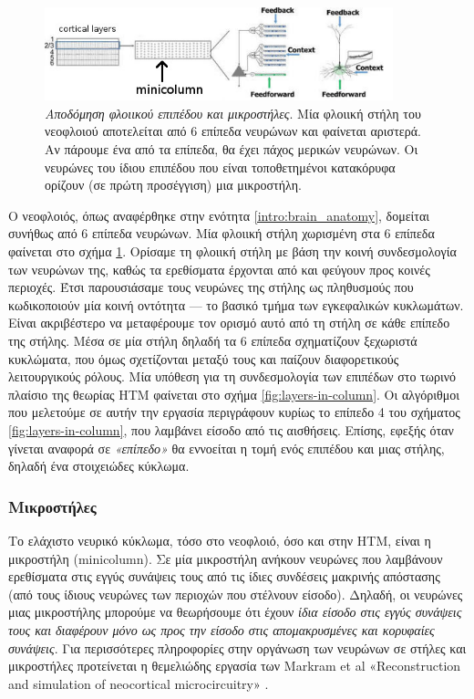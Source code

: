 	\begin{figure}
		\centering
		\includegraphics[width=0.9\textwidth]{figures/layer-minicolumn}
		\caption{\textit{Αποδόμηση φλοιικού επιπέδου και μικροστήλες}.
		Μία φλοιική στήλη του νεοφλοιού αποτελείται από 6 επίπεδα νευρώνων και φαίνεται αριστερά.
		Αν πάρουμε ένα από τα επίπεδα, θα έχει πάχος μερικών νευρώνων.
		Οι νευρώνες του ίδιου επιπέδου που είναι τοποθετημένοι κατακόρυφα ορίζουν (σε πρώτη προσέγγιση) μια μικροστήλη.
		\parencite[πηγή][(τροποποιημένο)]{cuiContinuousOnlineSequence2016}
		}
		\label{fig:layer-minicolumn}
	\end{figure}

	Ο νεοφλοιός, όπως αναφέρθηκε στην ενότητα \ref{intro:brain_anatomy}, δομείται συνήθως από 6 επίπεδα νευρώνων.
	Μία φλοιική στήλη χωρισμένη στα 6 επίπεδα φαίνεται στο σχήμα \ref{fig:layer-minicolumn}.
	Ορίσαμε τη φλοιική στήλη με βάση την κοινή συνδεσμολογία των νευρώνων της, καθώς τα ερεθίσματα έρχονται από και φεύγουν προς κοινές περιοχές.
	Έτσι παρουσιάσαμε τους νευρώνες της στήλης ως πληθυσμούς που κωδικοποιούν μία κοινή οντότητα --- το βασικό τμήμα των εγκεφαλικών κυκλωμάτων.
	Είναι ακριβέστερο να μεταφέρουμε τον ορισμό αυτό από τη στήλη σε κάθε επίπεδο της στήλης.
	Μέσα σε μία στήλη δηλαδή τα 6 επίπεδα σχηματίζουν ξεχωριστά κυκλώματα, που όμως σχετίζονται μεταξύ τους και παίζουν διαφορετικούς λειτουργικούς ρόλους.
	Μία υπόθεση για τη συνδεσμολογία των επιπέδων στο τωρινό πλαίσιο της θεωρίας HTM φαίνεται στο σχήμα \ref{fig:layers-in-column}.
  Οι αλγόριθμοι που μελετούμε σε αυτήν την εργασία περιγράφουν κυρίως το επίπεδο 4 του σχήματος \ref{fig:layers-in-column}, που λαμβάνει είσοδο από τις αισθήσεις.
	Επίσης, εφεξής όταν γίνεται αναφορά σε \textit{«επίπεδο»} θα εννοείται η τομή ενός επιπέδου και μιας στήλης, δηλαδή ένα στοιχειώδες κύκλωμα.

	\subsubsection{Μικροστήλες}

	Το ελάχιστο νευρικό κύκλωμα, τόσο στο νεοφλοιό, όσο και στην HTM, είναι η μικροστήλη (minicolumn).
	Σε μία μικροστήλη ανήκουν νευρώνες που λαμβάνουν ερεθίσματα στις εγγύς συνάψεις τους από τις ίδιες συνδέσεις μακρινής απόστασης
	(από τους ίδιους νευρώνες των περιοχών που στέλνουν είσοδο).
	Δηλαδή, οι νευρώνες μιας μικροστήλης μπορούμε να θεωρήσουμε ότι έχουν \textit{ίδια είσοδο στις εγγύς συνάψεις τους
	και διαφέρουν μόνο ως προς την είσοδο στις απομακρυσμένες και κορυφαίες συνάψεις}.
	Για περισσότερες πληροφορίες στην οργάνωση των νευρώνων σε στήλες και μικροστήλες προτείνεται η θεμελιώδης εργασία των Markram et al
	«Reconstruction and simulation of neocortical microcircuitry» \parencite{markramReconstructionSimulationNeocortical2015}.

